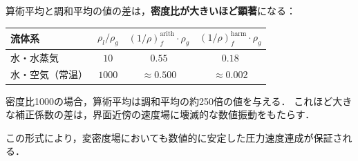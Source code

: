\begin{tcolorbox}[warnbox, title={実装上の確認事項}]
算術平均と調和平均の値の差は，\textbf{密度比が大きいほど顕著}になる：
\begin{center}
\begin{tabular}{lccc}
\hline
流体系 & $\rho_l/\rho_g$ & $(1/\rho)^{\mathrm{arith}}_f \cdot \rho_g$ & $(1/\rho)^{\mathrm{harm}}_f \cdot \rho_g$ \\
\hline
水・水蒸気 & $10$ & $0.55$ & $0.18$ \\
水・空気（常温） & $1000$ & $\approx 0.500$ & $\approx 0.002$ \\
\hline
\end{tabular}
\end{center}
密度比1000の場合，算術平均は調和平均の約250倍の値を与える．
これほど大きな補正係数の差は，界面近傍の速度場に壊滅的な数値振動をもたらす．
\end{tcolorbox}

この形式により，変密度場においても数値的に安定した圧力速度連成が保証される．

